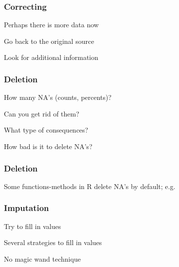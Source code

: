 \documentclass[12pt]{beamer}\usepackage[]{graphicx}\usepackage[]{color}
\begin{document}

\begin{frame}
\frametitle{Correcting}

\bbi
  \item Perhaps there is more data now
  \item Go back to the original source
  \item Look for additional information
\ei
\eb

\end{frame}


\begin{frame}
\frametitle{Deletion}

\bbi
  \item How many NA's (counts, percents)?
  \item Can you get rid of them?
  \item What type of consequences?
  \item How bad is it to delete NA's?
\ei
\eb

\end{frame}


\begin{frame}
\frametitle{Deletion}

\bbi
  \item {}
  \item {}
  \item {}
  \item Some functions-methods in R delete NA's by default; e.g. 
\ei
\eb

\end{frame}


\begin{frame}
\frametitle{Imputation}

\bbi
  \item Try to fill in values
  \item Several strategies to fill in values
  \item No magic wand technique
\ei
\eb

\end{frame}

\end{document}
